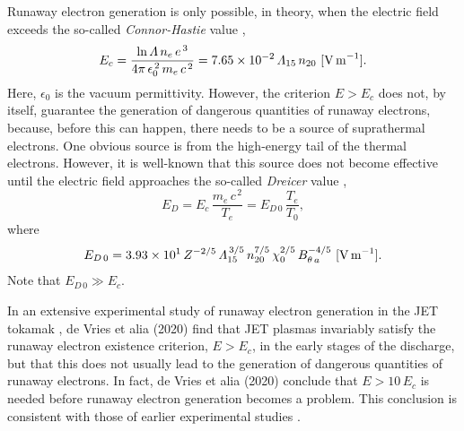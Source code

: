 \documentclass{iopjournal}
\begin{document}
 Runaway electron generation is only possible, in theory,  when the electric field exceeds the so-called {\em Connor-Hastie}\/ value \cite{connor},
 \begin{equation}
 E_c = \frac{\ln{\mit\Lambda}\,n_e\,e^{\,3}}{4\pi\,\epsilon_0^{\,2}\,m_e\,c^{\,2}} = 7.65\times 10^{-2}\,{\mit\Lambda}_{15}\,n_{20}\,\,[{\rm V\,m}^{-1}].
 \end{equation}
 Here, $\epsilon_0$ is the vacuum permittivity. 
 However, the criterion $E>E_c$ does not,  by itself, guarantee the generation of dangerous quantities of runaway electrons, because, before this
 can happen, there needs to be a source of suprathermal electrons. One obvious source is from the high-energy tail of the thermal electrons. However,
 it is well-known that this source does not become effective until the electric field approaches the so-called {\em Dreicer}\/ value \cite{dreicer},
 \begin{equation}
 E_D = E_c\,\frac{m_e\,c^{\,2}}{T_e}= E_{D\,0}\,\frac{T_e}{T_0},
 \end{equation}
 where
 \begin{equation}
 E_{D\,0} = 3.93\times 10^{1}\,Z^{-2/5}\,{\mit\Lambda}_{15}^{\,3/5}\,n_{20}^{7/5}\,\chi_0^{2/5}\,B_{\theta\,a}^{-4/5}\,\,[{\rm V\,m}^{-1}].
 \end{equation}
 Note that $E_{D\,0}\gg E_c$. 
 
 In an extensive experimental study of runaway electron generation in the JET tokamak \cite{run}, de Vries et alia (2020) find that JET
  plasmas invariably satisfy the runaway electron existence criterion, $E>E_c$, in the early stages of the discharge, but that this does not
 usually lead to the generation of dangerous quantities of runaway electrons. In fact, de Vries et alia (2020) conclude that $E>10\,E_c$ is
 needed before runaway electron generation becomes a problem. This conclusion is consistent with those of earlier experimental 
 studies \cite{granetz,paz,pop}.
 
\end{document}
